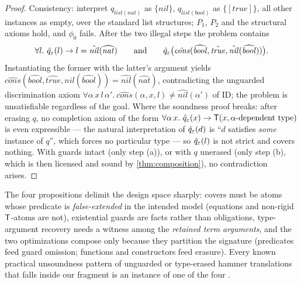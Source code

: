 \begin{proof}
  Consistency: interpret $q_{\mathit{list}(\mathit{nat})}$ as
  $\{\mathit{nil}\}$, $q_{\mathit{list}(\mathit{bool})}$ as
  $\{[\mathit{true}]\}$, all other instances as empty, over the standard
  list structures; $P_1$, $P_2$ and the structural axioms hold, and
  $\phi_0$ fails.  After the two illegal steps the problem contains
  \[
    \forall l.\ \hat q_{\varepsilon}(l) \rightarrow l =
    \hat{\mathit{nil}}(\widehat{\mathit{nat}})
    \qquad\text{and}\qquad
    \hat q_{\varepsilon}\bigl(\hat{\mathit{cons}}(\widehat{\mathit{bool}},
    \hat{\mathit{true}}, \hat{\mathit{nil}}(\widehat{\mathit{bool}}))\bigr).
  \]
  Instantiating the former with the latter's argument yields
  $\hat{\mathit{cons}}(\widehat{\mathit{bool}}, \hat{\mathit{true}},
  \hat{\mathit{nil}}(\widehat{\mathit{bool}})) =
  \hat{\mathit{nil}}(\widehat{\mathit{nat}})$, contradicting the
  unguarded discrimination axiom
  $\forall \alpha\, x\, l\, \alpha'.\
  \hat{\mathit{cons}}(\alpha,x,l) \neq \hat{\mathit{nil}}(\alpha')$ of
  $\mathrm{ID}$; the problem is unsatisfiable regardless of the goal.
  Where the soundness proof breaks: after erasing $q$, no completion
  axiom of the form
  $\forall \alpha\, x.\ \hat q_{\varepsilon}(x) \rightarrow \mathsf{T}(x, \alpha\text{-dependent
  type})$ is even expressible --- the natural interpretation of
  $\hat q_{\varepsilon}(d)$ is ``$d$ satisfies \emph{some} instance of $q$'',
  which forces no particular type --- so $\hat q_{\varepsilon}(l)$ is not strict
  and covers nothing.  With guards intact (only step (a)), or with $q$
  unerased (only step (b), which is then licensed and sound by
  \cref{thm:composition}), no contradiction arises.
\end{proof}

\begin{remark}
  The four propositions delimit the design space sharply: covers must be
  atoms whose predicate is \emph{false-extended} in the intended model
  (equations and non-rigid $\mathsf{T}$-atoms are not), existential guards are
  facts rather than obligations, type-argument recovery needs a witness
  among the \emph{retained term arguments}, and the two optimizations
  compose only because they partition the signature (predicates feed
  guard omission; functions and constructors feed erasure).  Every known
  practical unsoundness pattern of unguarded or type-erased hammer
  translations that falls inside our fragment is an instance of one of
  the four \cite{MengPaulson2008,BlanchetteBohmePopescuSmallbone2016,
  CzajkaKaliszyk2018}.
\end{remark}
